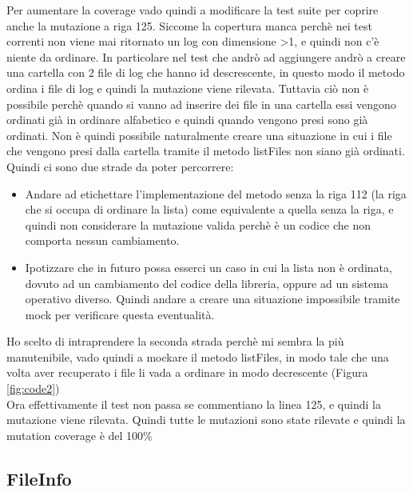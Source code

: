 \documentclass[12pt, a4paper]{article}
\begin{document}
Per aumentare la coverage vado quindi a modificare la test suite per coprire anche la mutazione a riga 125.
Siccome la copertura manca perchè nei test correnti non viene mai ritornato un log con dimensione >1, e 
quindi non c'è niente da ordinare. In particolare nel test che andrò ad aggiungere andrò a creare una cartella con 2 file
di log che hanno id descrescente, in questo modo il metodo ordina i file di log e quindi la mutazione viene rilevata.
Tuttavia ciò non è possibile perchè quando si vanno ad inserire dei file in una cartella essi vengono ordinati già in ordinare
alfabetico e quindi quando vengono presi sono già ordinati. Non è quindi possibile naturalmente creare una situazione 
in cui i file che vengono presi dalla cartella tramite il metodo listFiles\(\) non siano già ordinati. \\
Quindi ci sono due strade da poter percorrere:
\begin{itemize}
  \item Andare ad etichettare l'implementazione del metodo senza la riga 112 (la riga che si occupa di ordinare la lista) 
  come equivalente a quella senza la riga, e quindi non considerare la mutazione valida perchè è un codice che non
  comporta nessun cambiamento.
  \item Ipotizzare che in futuro possa esserci un caso in cui la lista non è ordinata, dovuto ad un cambiamento del codice
  della libreria, oppure ad un sistema operativo diverso. Quindi andare a creare una situazione impossibile tramite mock per
  verificare questa eventualità.
\end{itemize}

Ho scelto di intraprendere la seconda strada perchè mi sembra la più manutenibile, vado quindi a mockare 
il metodo listFiles\(\), in modo tale che una volta aver recuperato i file li vada a 
ordinare in modo decrescente (Figura \ref{fig:code2}) \\

Ora effettivamente il test non passa se commentiano la linea 125, e quindi la mutazione viene rilevata.
Quindi tutte le mutazioni sono state rilevate e quindi la mutation coverage è del 100\% 

\subsection{FileInfo}
\end{document}
